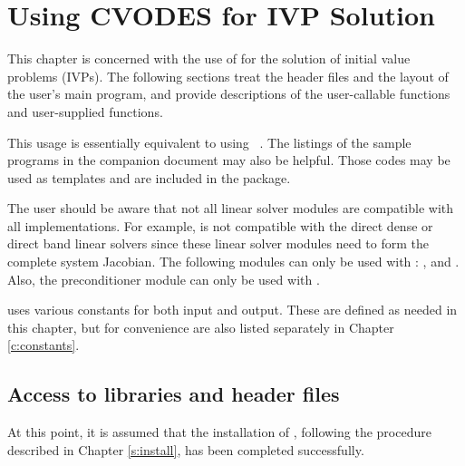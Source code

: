 \chapter{Using CVODES for IVP Solution}\label{s:simulation}

This chapter is concerned with the use of {\cvodes} for the solution of
initial value problems (IVPs).  The following sections treat the header
files and the layout of the user's main program, and provide descriptions
of the {\cvodes} user-callable functions and user-supplied functions.

This usage is essentially equivalent to using {\cvode}~\cite{cvode2.4.0_ug}.
The listings of the sample programs in the companion document \cite{cvode2.4.0_ex} 
may also be helpful.  Those codes may be used as templates and are included 
in the {\cvodes} package.

The user should be aware that not all linear solver modules are compatible 
with all {\nvector} implementations. 
For example, {\nvecp} is not compatible with the direct dense or direct band 
linear solvers since these linear solver modules need to form the complete
system Jacobian. The following {\cvodes} modules can only be used with {\nvecs}:
{\cvdense}, {\cvband} and {\cvbandpre}. Also, the preconditioner module {\cvbbdpre}
can only be used with {\nvecp}. 

{\cvodes} uses various constants for both input and output.  These are
defined as needed in this chapter, but for convenience are also listed
separately in Chapter \ref{c:constants}.

\section{Access to libraries and header files}\label{ss:file_access}

At this point, it is assumed that the installation of {\cvodes},
following the procedure described in Chapter \ref{s:install}, has
been completed successfully.

